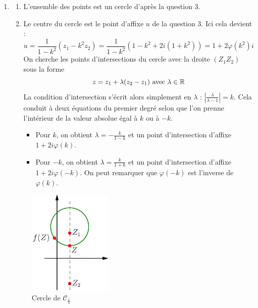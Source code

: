 \begin{enumerate}
\item \begin{enumerate}
\item L'ensemble des points est un cercle d'après la question 3.
\item Le centre du cercle est le point d'affixe $u$ de la question 3. Ici cela devient :
\begin{displaymath}
 u = \frac{1}{1-k^2}(z_1 -k^2z_2) = \frac{1}{1-k^2}(1-k^2 +2i(1+k^2)) = 1 + 2\varphi(k^2)i
\end{displaymath}
On cherche les points d'intersections du cercle avec la droite $(Z_1Z_2)$ sous la forme
\begin{displaymath}
 z= z_1 + \lambda (z_2-z_1) \text{ avec } \lambda \in \mathbb{R}
\end{displaymath}
La condition d'intersection s'écrit alors simplement en $\lambda$ : $\left \vert \frac{\lambda}{\lambda -1}\right \vert = k$.
Cela conduit à deux équations du premier degré selon que l'on prenne l'intérieur de la valeur absolue égal à $k$ ou à $-k$.
\begin{itemize}
 \item Pour $k$, on obtient $\lambda=-\frac{k}{1-k}$ et un point d'intersection d'affixe $1+2i\varphi(k)$.
 \item Pour $-k$, on obtient $\lambda= \frac{k}{1+k}$ et un point d'intersection d'affixe $1+2i\varphi(-k)$.
On peut remarquer que $\varphi(-k)$ est l'inverse de $\varphi(k)$.
\end{itemize}
\end{enumerate}

\begin{figure}[!h]
\centering
\includegraphics[width=4cm]{Chomog_2.pdf}
\caption{Cercle de $\mathcal C_\frac{1}{3}$}
\label{fig:Chomog_2}
\end{figure}


\end{enumerate}
